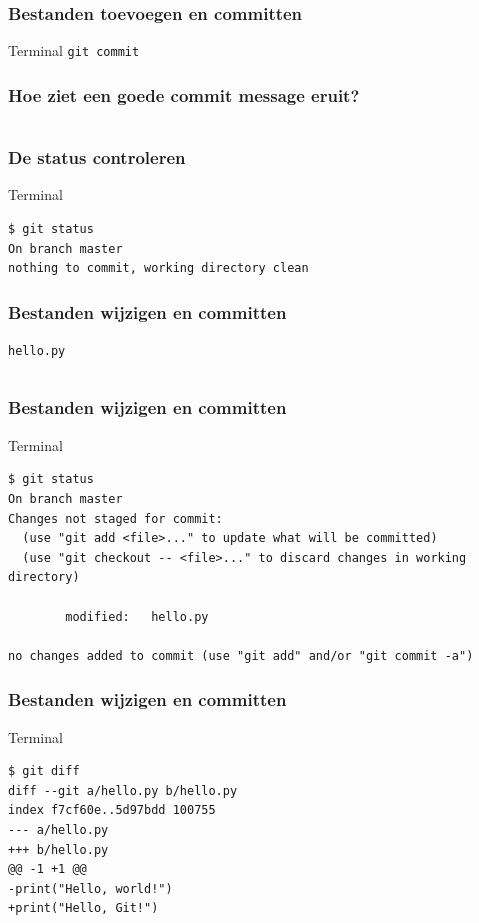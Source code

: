 \documentclass[]{beamer}
\begin{document}
\begin{frame}[fragile]
    \frametitle{Bestanden toevoegen en committen}

    \begin{block}{Terminal}
    \verb/git commit/
    \end{block}
\end{frame}

\begin{frame}[plain]
    \frametitle{Hoe ziet een goede commit message eruit?}

    \inputminted[fontsize=\scriptsize]{text}{source/commit-message.txt}
\end{frame}

\begin{frame}[fragile]
    \frametitle{De status controleren}

    \begin{block}{Terminal}
\begin{Verbatim}[fontsize=\scriptsize]
$ git status
On branch master
nothing to commit, working directory clean
\end{Verbatim}
    \end{block}
\end{frame}

\begin{frame}[fragile]
    \frametitle{Bestanden wijzigen en committen}

    \texttt{hello.py}
    \inputminted[bgcolor=monokaibg]{python}{source/hello2.py}
\end{frame}

\begin{frame}[fragile]
    \frametitle{Bestanden wijzigen en committen}

    \begin{block}{Terminal}
\begin{Verbatim}[fontsize=\tiny]
$ git status
On branch master
Changes not staged for commit:
  (use "git add <file>..." to update what will be committed)
  (use "git checkout -- <file>..." to discard changes in working directory)

        modified:   hello.py

no changes added to commit (use "git add" and/or "git commit -a")
\end{Verbatim}
    \end{block}
\end{frame}

\begin{frame}[fragile]
    \frametitle{Bestanden wijzigen en committen}

    \begin{block}{Terminal}
\begin{Verbatim}[fontsize=\tiny]
$ git diff
diff --git a/hello.py b/hello.py
index f7cf60e..5d97bdd 100755
--- a/hello.py
+++ b/hello.py
@@ -1 +1 @@
-print("Hello, world!")
+print("Hello, Git!")
\end{Verbatim}
    \end{block}
\end{frame}
\end{document}
